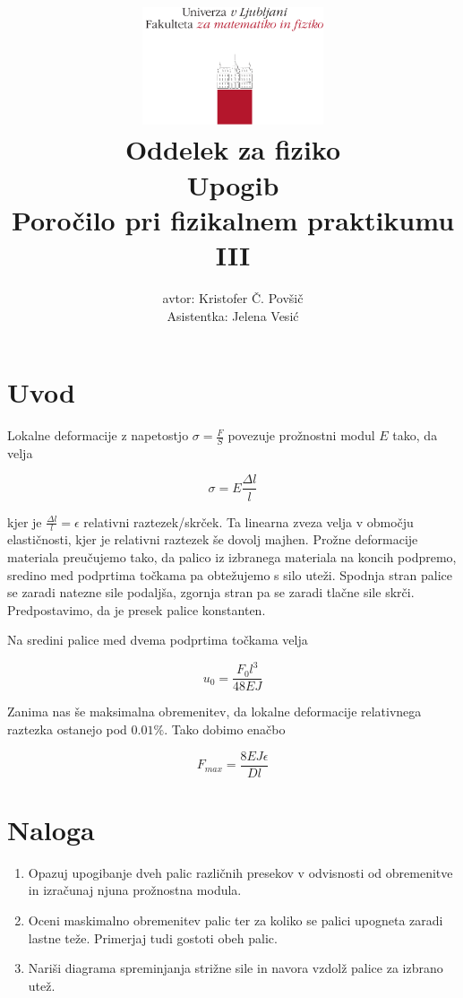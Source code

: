 \documentclass[12pt]{report}
\title{
  \includegraphics[width=0.4\textwidth]{fmf_logo}\\
  {\small Oddelek za fiziko} \\
  {Upogib}\\
  {\small Poročilo pri fizikalnem praktikumu III}\\

}
\date{}
\author{ avtor: Kristofer Č. Povšič \\[5 cm]
 \small  Asistentka: Jelena Vesić
}
\begin{document}
\setcounter{page}{2}

\maketitle

\chapter*{Uvod}

Lokalne deformacije z napetostjo $\sigma = \frac{F}{S}$ povezuje prožnostni modul $E$ tako, da velja 

\begin{equation}
  \sigma = E \frac{\Delta l}{l}
\end{equation}

kjer je $\frac{\Delta l}{l} = \epsilon$ relativni raztezek/skrček. Ta linearna zveza velja v območju elastičnosti, kjer je relativni raztezek še dovolj majhen. Prožne deformacije materiala preučujemo tako, da palico iz izbranega materiala na koncih podpremo, sredino med podprtima točkama pa obtežujemo s silo uteži. Spodnja stran palice se zaradi natezne sile podaljša, zgornja stran pa se zaradi tlačne sile skrči. Predpostavimo, da je presek palice konstanten. 

Na sredini palice med dvema podprtima točkama velja 

\begin{equation}
  u_0 = \frac{F_0 l^3}{48EJ}
\end{equation}

Zanima nas še maksimalna obremenitev, da lokalne deformacije relativnega raztezka ostanejo pod $0.01\%$. Tako dobimo enačbo 

\begin{equation}
  F_{max} = \frac{8EJ\epsilon}{Dl}
\end{equation}

\chapter*{Naloga}

\begin{enumerate}
  \item Opazuj upogibanje dveh palic različnih presekov v odvisnosti od obremenitve in izračunaj njuna prožnostna modula. 
  \item Oceni maskimalno obremenitev palic ter za koliko se palici upogneta zaradi lastne teže. Primerjaj tudi gostoti obeh palic. 
  \item Nariši diagrama spreminjanja strižne sile in navora vzdolž palice za izbrano utež. 
\end{enumerate}
\end{document}
